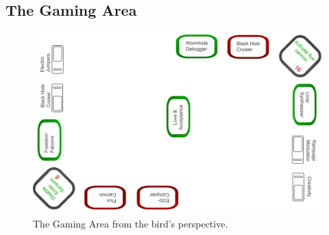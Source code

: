 \documentclass{sigchi}
\begin{document}
\subsection{The Gaming Area}



\begin{figure}[H]
\centering
\includegraphics[width=0.9\columnwidth]{walkthrough/gamingarea}
\caption{The Gaming Area from the bird's perspective.}
\label{fig:beamingArea}
\end{figure}
\vspace{2mm}
\end{document}
